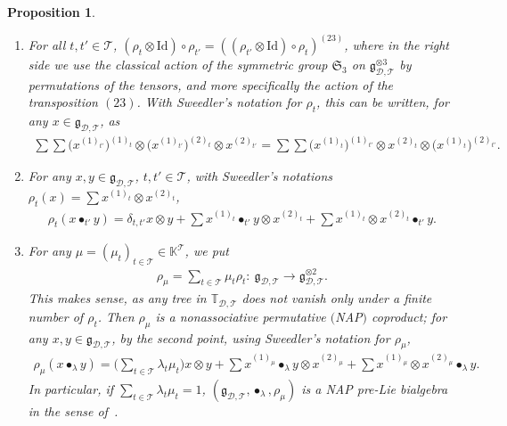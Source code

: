 \documentclass[pdftex]{sigma}
\numberwithin{equation}{section}
\newtheorem{Proposition}[Theorem]{Proposition}
 { \theoremstyle{definition}
\newtheorem{Definition}[Theorem]{Definition}
\newtheorem{Note}[Theorem]{Note}
\newtheorem{Example}[Theorem]{Example}
\newtheorem{Remark}[Theorem]{Remark}
\newtheorem{Notation}[Theorem]{Notation}}
\newcommand{\K}{\mathbb{K}}
\newcommand{\T}{\mathcal{T}}
\newcommand{\D}{\mathcal{D}}
\newcommand{\g}{\mathfrak{g}}
\newcommand{\bfT}{\mathbb{T}}
\newcommand{\id}{\mathrm{Id}}
\begin{document}
\begin{Proposition} \label{prop14}\qquad

\begin{enumerate}\itemsep=0pt
\item[$1.$] For all $t,t'\in \T$, $(\rho_t\otimes \id)\circ \rho_{t'}=((\rho_{t'}\otimes \id)\circ \rho_t)^{(23)}$,
where in the right side we use the classical action of the symmetric group $\mathfrak{S}_3$ on $\g_{\D,\T}^{\otimes 3}$
by permutations of the tensors, and more specifically the action of the transposition $(23)$. With Sweedler's notation for
$\rho_t$, this can be written, for any $x\in \g_{\D,\T}$, as
\begin{gather*}
\sum\sum \big(x^{(1)_{t'}}\big)^{(1)_t}\otimes \big(x^{(1)_{t'}}\big)^{(2)_t} \otimes x^{(2)_{t'}}
=\sum\sum \big(x^{(1)_t}\big)^{(1)_{t'}}\otimes x^{(2)_t}\otimes \big(x^{(1)_t}\big)^{(2)_{t'}}.
\end{gather*}

\item[$2.$] For any $x,y\in \g_{\D,\T}$, $t,t'\in \T$, with Sweedler's notations
$\rho_t(x)=\sum x^{(1)_t}\otimes x^{(2)_t}$,
\begin{gather*}
\rho_t(x\bullet_{t'} y)=\delta_{t,t'} x\otimes y+\sum x^{(1)_t}\bullet_{t'} y\otimes x^{(2)_t}
+\sum x^{(1)_t}\otimes x^{(2)_t}\bullet_{t'} y.
\end{gather*}

\item[$3.$] For any $\mu=(\mu_t)_{t\in \T}\in \K^\T$, we put
\begin{gather*}
\rho_\mu=\sum_{t\in \T} \mu_t \rho_t\colon\ \g_{\D,\T}\longrightarrow \g_{\D,\T}^{\otimes 2}.
\end{gather*}
This makes sense, as any tree in $\bfT_{\D,\T}$ does not vanish only under a finite number of $\rho_t$.
Then $\rho_\mu$ is a nonassociative permutative $($NAP$)$ coproduct;
for any $x,y\in \g_{\D,\T}$, by the second point, using Sweedler's notation for $\rho_\mu$,
\begin{gather*}
\rho_\mu(x\bullet_\lambda y)=\bigg(\sum_{t\in \T} \lambda_t\mu_t\bigg) x\otimes y
+\sum x^{(1)_\mu}\bullet_\lambda y\otimes x^{(2)_\mu}
+\sum x^{(1)_\mu}\otimes x^{(2)_\mu}\bullet_\lambda y.
\end{gather*}
In particular, if $\sum_{t\in \T} \lambda_t\mu_t=1$,
$(\g_{\D,\T},\bullet_\lambda,\rho_\mu)$ is a NAP pre-Lie bialgebra in the sense of~{\rm\cite{Livernet}}.
\end{enumerate}
\end{Proposition}
\end{document}
